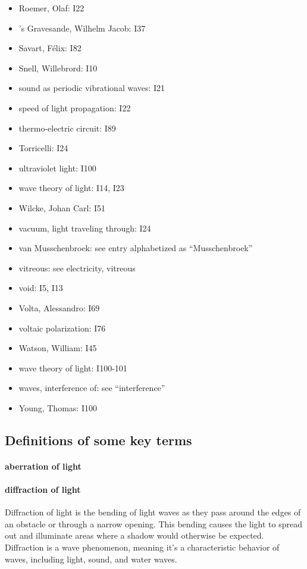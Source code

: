 \documentclass[a4paper]{article}
\theoremstyle{plain}
\theoremstyle{definition}
\begin{document}
\begin{itemize}
\item Roemer, Olaf: I22
\item 's Gravesande, Wilhelm Jacob: I37
\item Savart, F\'{e}lix: I82
\item Snell, Willebrord: I10
\item sound as periodic vibrational waves: I21
\item speed of light propagation: I22
\item thermo-electric circuit: I89
\item Torricelli: I24
\item ultraviolet light: I100
\item wave theory of light: I14, I23
\item Wilcke, Johan Carl: I51
\item vacuum, light traveling through: I24
\item van Musschenbroek: see entry alphabetized as ``Musschenbroek''
\item vitreous: see electricity, vitreous
\item void: I5, I13
\item Volta, Alessandro: I69
\item voltaic polarization: I76
\item Watson, William: I45
\item wave theory of light: I100-101
\item waves, interference of: see ``interference''
\item Young, Thomas: I100
\end{itemize}

\subsection{Definitions of some key terms}

\paragraph{aberration of light}

\paragraph{diffraction of light}

Diffraction of light is the bending of light waves as they pass around
the edges of an obstacle or through a narrow opening.  This bending
causes the light to spread out and illuminate areas where a shadow
would otherwise be expected.  Diffraction is a wave phenomenon,
meaning it's a characteristic behavior of waves, including light,
sound, and water waves.
\end{document}
